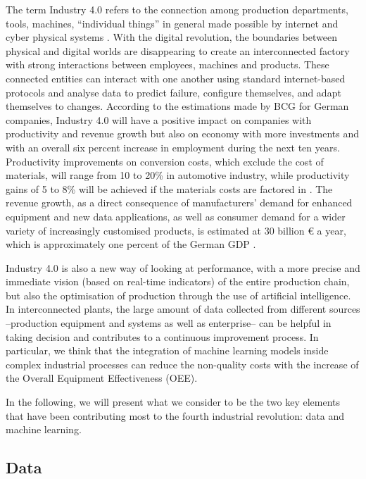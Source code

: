 The term Industry 4.0 refers to the connection among production departments, tools, machines, “individual things” in general made possible by internet and cyber physical systems \citep{schlapfer2015industry}.
With the digital revolution, the boundaries between physical and digital worlds are disappearing to create an interconnected factory with strong interactions between employees, machines and products. These connected entities can interact with one another using standard internet-based protocols and analyse data to predict failure, configure themselves, and adapt themselves to changes.
According to the estimations made by BCG for German companies, Industry 4.0 will have a positive impact on companies with productivity and revenue growth but also on economy with more investments and with an overall six percent increase in employment during the next ten years. Productivity improvements on conversion costs, which exclude the cost of materials, will range from 10 to 20\% in automotive industry, while productivity gains of 5 to 8\% will be achieved if the materials costs are factored in \citep{lorenz2016time}. The revenue growth, as a direct consequence of  manufacturers' demand for enhanced equipment and new data applications, as well as consumer demand for a wider variety of increasingly customised products, is estimated at 30 billion € a year, which is approximately one percent of the German GDP \citep{russmann2015industry}. 

Industry 4.0 is also a new way of looking at performance, with a more precise and immediate vision (based on real-time indicators) of the entire production chain, but also the optimisation of production through the use of artificial intelligence. In interconnected plants, the large amount of data collected from different sources --production equipment and systems as well as enterprise-- can be helpful in taking decision and contributes to a continuous improvement process. In particular, we think that the integration of machine learning models inside complex industrial processes can reduce the non-quality costs with the increase of the Overall Equipment Effectiveness (OEE). 

In the following, we will present what we consider to be the two key elements that have been contributing most to the fourth industrial revolution: data and machine learning.


\subsection{Data}

